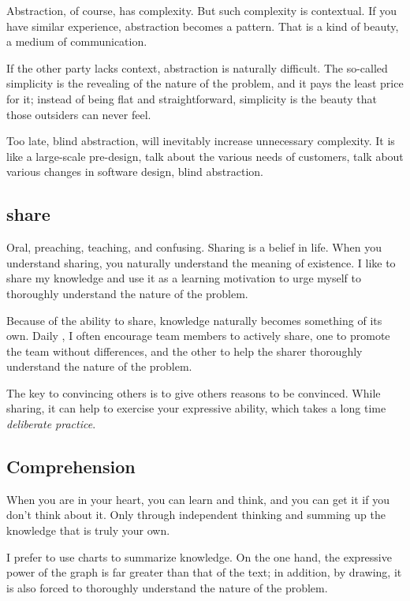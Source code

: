 \begin{content}
Abstraction, of course, has complexity. But such complexity is contextual. If you have similar experience, abstraction becomes a pattern. That is a kind of beauty, a medium of communication.

If the other party lacks context, abstraction is naturally difficult. The so-called simplicity is the revealing of the nature of the problem, and it pays the least price for it; instead of being flat and straightforward, simplicity is the beauty that those outsiders can never feel.

Too late, blind abstraction, will inevitably increase unnecessary complexity. It is like a large-scale pre-design, talk about the various needs of customers, talk about various changes in software design, blind abstraction.

\subsection{share}

Oral, preaching, teaching, and confusing. Sharing is a belief in life. When you understand sharing, you naturally understand the meaning of existence. I like to share my knowledge and use it as a learning motivation to urge myself to thoroughly understand the nature of the problem.

Because of the ability to share, knowledge naturally becomes something of its own. Daily , I often encourage team members to actively share, one to promote the team without differences, and the other to help the sharer thoroughly understand the nature of the problem.

The key to convincing others is to give others reasons to be convinced. While sharing, it can help to exercise your expressive ability, which takes a long time \emph{deliberate practice}.

\subsection{Comprehension}

When you are in your heart, you can learn and think, and you can get it if you don’t think about it. Only through independent thinking and summing up the knowledge that is truly your own.

I prefer to use charts to summarize knowledge. On the one hand, the expressive power of the graph is far greater than that of the text; in addition, by drawing, it is also forced to thoroughly understand the nature of the problem.

\end{content}

